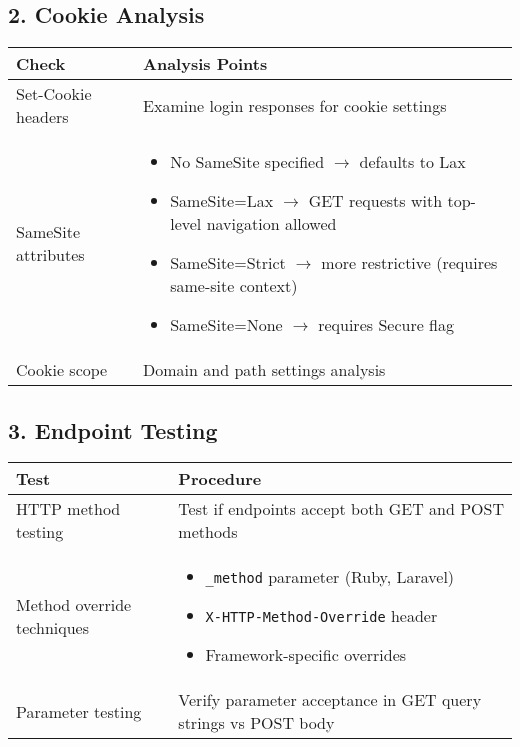 \documentclass{article}
\begin{document}
\subsection*{2. Cookie Analysis}
\begin{tabular}{>{\raggedright\arraybackslash}p{}>{\raggedright\arraybackslash}p{}}
    \toprule
    \textbf{Check} & \textbf{Analysis Points} \\
    \midrule
    Set-Cookie headers & Examine login responses for cookie settings \\
    SameSite attributes & 
    \begin{itemize}
        \setlength\itemsep{0em}
        \item No SameSite specified $\rightarrow$ defaults to Lax
        \item SameSite=Lax $\rightarrow$ GET requests with top-level navigation allowed
        \item SameSite=Strict $\rightarrow$ more restrictive (requires same-site context)
        \item SameSite=None $\rightarrow$ requires Secure flag
    \end{itemize} \\
    Cookie scope & Domain and path settings analysis \\
    \bottomrule
\end{tabular}

\subsection*{3. Endpoint Testing}
\begin{tabular}{>{\raggedright\arraybackslash}p{}>{\raggedright\arraybackslash}p{}}
    \toprule
    \textbf{Test} & \textbf{Procedure} \\
    \midrule
    HTTP method testing & Test if endpoints accept both GET and POST methods \\
    Method override techniques & 
    \begin{itemize}
        \setlength\itemsep{0em}
        \item \texttt{\_method} parameter (Ruby, Laravel)
        \item \texttt{X-HTTP-Method-Override} header
        \item Framework-specific overrides
    \end{itemize} \\
    Parameter testing & Verify parameter acceptance in GET query strings vs POST body \\
    \bottomrule
\end{tabular}
\end{document}
